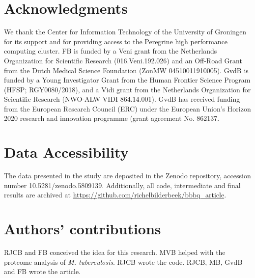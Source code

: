 \section{Acknowledgments}

We thank the Center for Information Technology of the University 
of Groningen for its support and for providing access to the Peregrine 
high performance computing cluster. 
FB is funded by a Veni grant from the Netherlands Organization for Scientific
Research (016.Veni.192.026) and an Off-Road Grant from the Dutch Medical Science Foundation (ZonMW 04510011910005).
GvdB is funded by a Young Investigator Grant from 
the Human Frontier Science Program (HFSP; RGY0080/2018), 
and a Vidi grant from 
the Netherlands Organization for Scientific Research (NWO-ALW VIDI 864.14.001). 
GvdB has received funding from the European Research Council (ERC) 
under the European Union’s Horizon 2020 research and 
innovation programme (grant agreement No. 862137. 

\section{Data Accessibility}

The data presented in the study are deposited in the Zenodo repository, accession number 10.5281/zenodo.5809139.
Additionally, all code, intermediate and final results are archived at 
\url{https://github.com/richelbilderbeek/bbbq_article}.

\section{Authors' contributions}

RJCB and FB conceived the idea for this research. 
MVB helped with the proteome analysis of \emph{M. tuberculosis}.
RJCB wrote the code.
RJCB, MB, GvdB and FB wrote the article.


%



